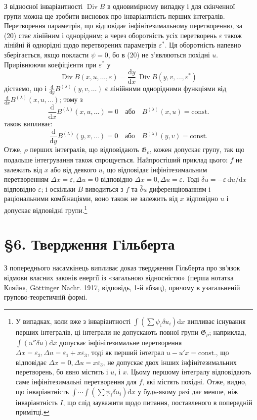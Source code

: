 \documentclass[11pt]{article}
\providecommand{\G}{\mathfrak G}
\providecommand{\eps}{\varepsilon}
\providecommand{\D}{\Delta}
\providecommand{\dd}{\mathrm d}
\DeclareMathOperator{\Div}{Div}
\providecommand{\bd}{\bar{\delta}}
\begin{document}
З відносної інваріантності \(\Div B\) в одновимірному випадку і для скінченної групи можна ще зробити висновок про інваріантність перших інтегралів. Перетворення параметрів, що відповідає інфінітезимальному перетворенню, за (20) стає лінійним і однорідним; а через оборотність усіх перетворень \(\eps\) також лінійні й однорідні щодо перетворених параметрів \(\eps^*\). Ця оборотність напевно зберігається, якщо покласти \(\psi=0\), бо в (20) не з'являються похідні \(u\). Прирівнюючи коефіцієнти при \(\eps^*\) у
\[
\Div B(x,u,\ldots,\eps)=\frac{\dd y}{\dd x}\,\Div B(y,v,\ldots,\eps^*)
\]
дістаємо, що і \(\frac{\dd}{\dd y}B^{(\lambda)}(y,v,\ldots)\) є лінійними однорідними функціями від \(\frac{\dd}{\dd x}B^{(\lambda)}(x,u,\ldots)\); тому з
\[
\frac{\dd}{\dd x}B^{(\lambda)}(x,u,\ldots)=0
\quad\text{або}\quad B^{(\lambda)}(x,u)=\mathrm{const.}
\]
також випливає:
\[
\frac{\dd}{\dd y}B^{(\lambda)}(y,v,\ldots)=0
\quad\text{або}\quad B^{(\lambda)}(y,v)=\mathrm{const.}
\]
Отже, \(\rho\) перших інтегралів, що відповідають \(\G_\rho\), кожен допускає групу, так що подальше інтегрування також спрощується. Найпростіший приклад цього: \(f\) не залежить від \(x\) або від деякого \(u\), що відповідає інфінітезимальним перетворенням \(\D x=\eps,\D u=0\) відповідно \(\D x=0,\D u=\eps\). Тоді \(\bd u=-\eps\,\dd u/\dd x\) відповідно \(\eps\); і оскільки \(B\) виводиться з \(f\) та \(\bd u\) диференціюванням і раціональними комбінаціями, воно також не залежить від \(x\) відповідно \(u\) і допускає відповідні групи.\footnote{У випадках, коли вже з інваріантності \(\int(\sum\psi_i\delta u_i)\dd x\) випливає існування перших інтегралів, ці інтеграли не допускають повної групи \(\G_\rho\); наприклад, \(\int(u''\delta u)\dd x\) допускає інфінітезимальне перетворення \(\D x=\eps_2,\D u=\eps_1+x\eps_3\), тоді як перший інтеграл \(u-u'x=\mathrm{const.}\), що відповідає \(\D x=0,\D u=x\eps_3\), не допускає двох інших інфінітезимальних перетворень, бо явно містить і \(u\), і \(x\). Цьому першому інтегралу відповідають саме інфінітезимальні перетворення для \(f\), які містять похідні. Отже, видно, що інваріантність \(\int\!\cdots\!\int(\sum\psi_i\delta u_i)\dd x\) у будь-якому разі дає менше, ніж інваріантність \(I\), що слід зауважити щодо питання, поставленого в попередній примітці.}

\section*{\S{}6. Твердження Гільберта}

З попереднього насамкінець випливає доказ твердження Гільберта про зв'язок відмови власних законів енергії із «загальною відносністю» (перша нотатка Кляйна, Göttinger Nachr. 1917, відповідь, 1-й абзац), причому в узагальненій групово-теоретичній формі.
\end{document}
